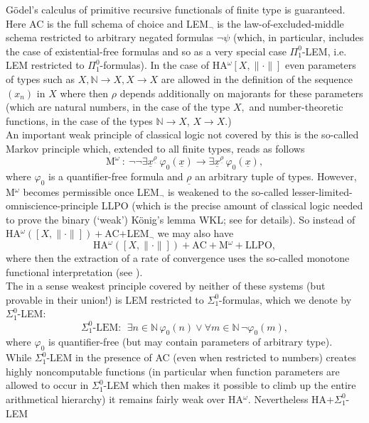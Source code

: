 \documentclass[1p]{elsarticle}
\newcommand{\NN}{\ensuremath{\mathbb{N}}}
\theoremstyle{plain}
\theoremstyle{definition}
\theoremstyle{remark}
\theoremstyle{definition}
\begin{document}
G\"odel's calculus of primitive recursive functionals of 
finite type is guaranteed.  Here AC is the full schema of choice and 
LEM$_{\neg}$ is the law-of-excluded-middle schema restricted to arbitrary 
negated formulas $\neg\psi$ (which, in particular, includes the case 
of existential-free formulas and so as a very special case $\Pi^0_1$-LEM, 
i.e. LEM restricted to $\Pi^0_1$-formulas). In the case of 
HA$^{\omega}[X,\| \cdot\|]$ even parameters of types such as $X, \NN\to X, 
X\to X$ are allowed in the definition of the sequence $(x_n)$ in $X$ where 
then $\rho$ depends additionally on majorants for these parameters (which are 
natural numbers, in the case of the type $X,$ and number-theoretic 
functions, in the case of the types $\NN\to X$, $X\to X.$) \\[2mm] 
An important weak principle of classical logic not covered by this is 
the so-called Markov principle which, extended to all finite types, reads 
as follows 
\[ \mbox{M}^{\omega}\ :\ 
\neg\neg\exists \underline{x}^{\underline{\rho}} \ \varphi_0(\underline{x})\to 
\exists \underline{x}^{\underline{\rho}}\,\varphi_0(\underline{x}), \] 
where $\varphi_0$ is a quantifier-free formula and $\underline{\rho}$ an 
arbitrary tuple of types. However, M$^{\omega}$ becomes permissible once 
LEM$_{\neg}$ is weakened to the so-called lesser-limited-omniscience-principle 
LLPO (which is the precise amount of classical logic needed to prove the 
binary (`weak') K\"onig's lemma WKL; see \cite{Kohlenbach(book)} for details).
So instead of HA$^{\omega}([X,\|\cdot\|])+$AC$+$LEM$_{\neg}$ we may also have 
\[ \mbox{HA$^{\omega}([X,\|\cdot \| ])+$AC$+$M$^{\omega}+$LLPO}, \] 
where then the extraction of a rate of convergence uses the so-called 
monotone functional interpretation (see \cite{Kohlenbach(book)}).
\\[2mm] The in a sense weakest principle covered by neither of these systems 
(but provable in their union!) is LEM restricted to $\Sigma^0_1$-formulas, 
which we denote by $\Sigma^0_1$-LEM: 
\[ \Sigma^0_1\mbox{-LEM}: \ \ \exists n\in\NN \,\varphi_0(n)\vee
\forall m\in\NN\,\neg \varphi_0(m), \]
where $\varphi_0$ is quantifier-free (but may contain parameters of 
arbitrary type). \\  
While $\Sigma^0_1$-LEM in the presence of 
AC (even when restricted to numbers) 
creates highly noncomputable functions (in particular when function 
parameters are allowed to occur in $\Sigma^0_1$-LEM which then makes it 
possible to climb up the entire arithmetical hierarchy) it remains fairly 
weak over HA$^{\omega}.$ Nevertheless HA$+\Sigma^0_1$-LEM 
\end{document}
